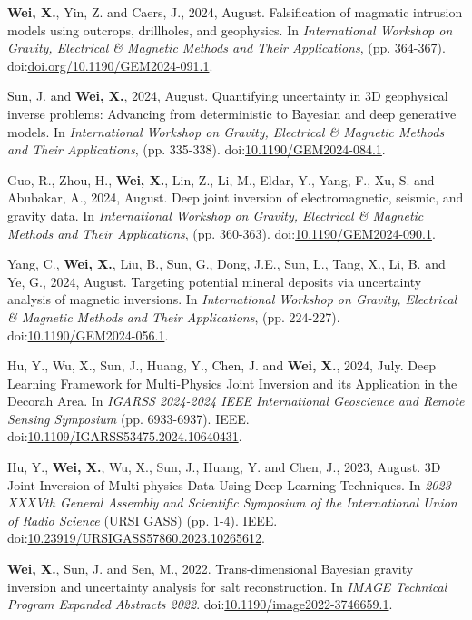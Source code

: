 \documentclass[11pt, a4paper]{article}
\newcommand{\LastName}{Wei}
\newcommand{\Initials}{X}
\newcommand{\Wei}{\textbf{\LastName, \Initials.}}  %
\newcommand{\DOI}[1]{doi:\href{https://doi.org/#1}{#1}}
\begin{document}
\begin{etaremune}
	
	\item 	
	\Wei, Yin, Z. and Caers, J., 2024, August. Falsification of magmatic intrusion models using outcrops, drillholes, and geophysics. In \emph{International Workshop on Gravity, Electrical \& Magnetic Methods and Their Applications}, (pp. 364-367). \DOI{doi.org/10.1190/GEM2024-091.1}.

	\item 	
	Sun, J. and \Wei, 2024, August. Quantifying uncertainty in 3D geophysical inverse problems: Advancing from deterministic to Bayesian and deep generative models. In \emph{International Workshop on Gravity, Electrical \& Magnetic Methods and Their Applications}, (pp. 335-338). \DOI{10.1190/GEM2024-084.1}.

	\item 
	Guo, R., Zhou, H., \Wei, Lin, Z., Li, M., Eldar, Y., Yang, F., Xu, S. and Abubakar, A., 2024, August. Deep joint inversion of electromagnetic, seismic, and gravity data. In \emph{International Workshop on Gravity, Electrical \& Magnetic Methods and Their Applications}, (pp. 360-363). \DOI{10.1190/GEM2024-090.1}.
	
	\item 
	Yang, C., \Wei, Liu, B., Sun, G., Dong, J.E., Sun, L., Tang, X., Li, B. and Ye, G., 2024, August. Targeting potential mineral deposits via uncertainty analysis of magnetic inversions. In \emph{International Workshop on Gravity, Electrical \& Magnetic Methods and Their Applications}, (pp. 224-227). \DOI{10.1190/GEM2024-056.1}.
	
	\item 
	Hu, Y., Wu, X., Sun, J., Huang, Y., Chen, J. and \Wei, 2024, July. Deep Learning Framework for Multi-Physics Joint Inversion and its Application in the Decorah Area. In \emph{IGARSS 2024-2024 IEEE International Geoscience and Remote Sensing Symposium} (pp. 6933-6937). IEEE. \DOI{10.1109/IGARSS53475.2024.10640431}.
	
	\item 
	Hu, Y., \Wei, Wu, X., Sun, J., Huang, Y. and Chen, J., 2023, August. 3D Joint Inversion of Multi-physics Data Using Deep Learning Techniques. In \emph{2023 XXXVth General Assembly and Scientific Symposium of the International Union of Radio Science} (URSI GASS) (pp. 1-4). IEEE. \DOI{10.23919/URSIGASS57860.2023.10265612}.
	
	\item
	\Wei, Sun, J. and Sen, M., 2022. Trans-dimensional Bayesian gravity inversion and uncertainty analysis for salt reconstruction. In \emph{IMAGE Technical Program Expanded Abstracts 2022}.  \DOI{10.1190/image2022-3746659.1}.


\end{etaremune}
\end{document}
